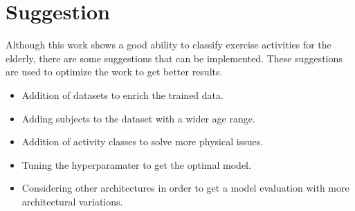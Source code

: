 

\section{Suggestion}
\label{sec4:Suggestion}
Although this work shows a good ability to classify exercise activities for the elderly, there are some suggestions that can be implemented. These suggestions are used to optimize the work to get better results.



\begin{itemize}
    \item Addition of datasets to enrich the trained data.
    \item Adding subjects to the dataset with a wider age range.
    \item Addition of activity classes to solve more physical issues.
    \item Tuning the hyperparamater to get the optimal model.
    \item Considering other architectures in order to get a model evaluation with more architectural variations.
\end{itemize}

\vspace{1ex}

